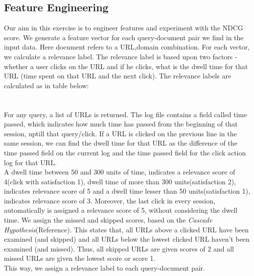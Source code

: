 \documentclass[11pt,letterpaper]{article}
\begin{document}
\subsection{Feature Engineering}
Our aim in this exercise is to engineer features and experiment with the NDCG score. We generate a feature vector for each query-document pair we find in the input data. Here document refers to a URL,domain combination. For each vector, we calculate a relevance label. The relevance label is based upon two factors - whether a user clicks on the URL and if he clicks, what is the dwell time for that URL (time spent on that URL and the next click). The relevance labels are calculated as in table below:\\
\\
\\
For any query, a list of URLs is returned. The log file contains a field called time passed, which indicates how much time has passed from the beginning of that session, uptill that query/click. If a URL is clicked on the previous line in the same session, we can find the dwell time for that URL as  the difference of the time passed field on the current log and the time passed field for the click action log for that URL.\\
A dwell time between 50 and 300 units of time, indicates a relevance score of 4(click with satisfaction 1), dwell time of more than 300 units(satisfaction 2), indicates relevance score of 5 and a dwell time lesser than 50 units(satisfaction 1), indicates relevance score of 3. Moreover, the last click in every session, automatically is assigned a relevance score of 5, without considering the dwell time. We assign the missed and skipped scores, based on the \textit{Cascade Hypothesis}(Reference). This states that, all URLs above a clicked URL have been examined (and skipped) and all URLs below the lowest clicked URL haven't been examined (and missed). Thus, all skipped URLs are given scores of 2 and all missed URLs are given the lowest score or score 1.\\
This way, we assign a relevance label to each query-document pair.  
\end{document}
